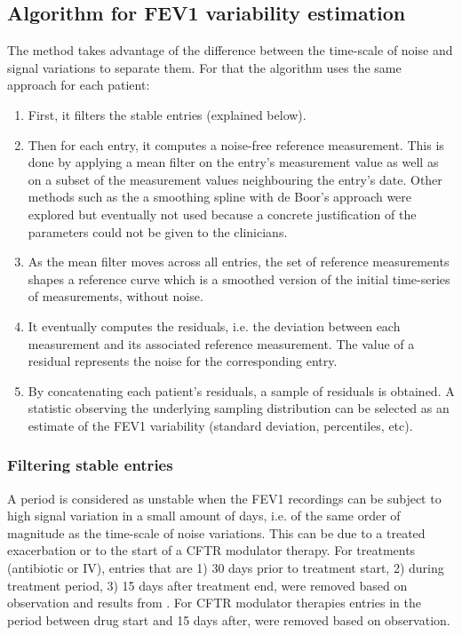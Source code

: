 \subsection{Algorithm for FEV1 variability estimation}
The method takes advantage of the difference between the time-scale of noise and signal variations to separate them. For that the algorithm uses the same approach for each patient:
\begin{enumerate}
    \item First, it filters the stable entries (explained below).
    \item Then for each entry, it computes a noise-free reference measurement. This is done by applying a mean filter on the entry’s measurement value as well as on a subset of the measurement values neighbouring the entry’s date. Other methods such as the a smoothing spline with de Boor's approach \cite{imoto_2003} were explored but eventually not used because a concrete justification of the parameters could not be given to the clinicians.
    \item As the mean filter moves across all entries, the set of reference measurements shapes a reference curve which is a smoothed version of the initial time-series of measurements, without noise.
    \item It eventually computes the residuals, i.e. the deviation between each measurement and its associated reference measurement. The value of a residual represents the noise for the corresponding entry.
    \item By concatenating each patient’s residuals, a sample of residuals is obtained. A statistic observing the underlying sampling distribution can be selected as an estimate of the FEV1 variability (standard deviation, percentiles, etc).
\end{enumerate}

\subsubsection{Filtering stable entries}
A period is considered as unstable when the FEV1 recordings can be subject to high signal variation in a small amount of days, i.e. of the same order of magnitude as the time-scale of noise variations. This can be due to a treated exacerbation or to the start of a CFTR modulator therapy. For treatments (antibiotic or IV), entries that are 1) 30 days prior to treatment start, 2) during treatment period, 3) 15 days after treatment end, were removed based on observation and results from \cite{damian}. For CFTR modulator therapies entries in the period between drug start and 15 days after, were removed based on observation.

